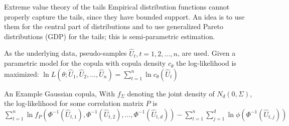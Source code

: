 Extreme value theory of the tails
Empirical distribution functions cannot properly capture the tails, since they have bounded support. An idea is to use them for the central part of distributions and to use generalized Pareto distributions (GDP) for the tails; this is semi-parametric estimation.

As the underlying data, pseudo-samples \(\hat{U}_t, t = 1, 2, ..., n\), are used.
Given a parametric model for the copula with copula density \(c_\theta\) the log-likelihood is maximized:
\(\ln L(\theta; \hat{U}_1, \hat{U}_2, ..., \hat{U}_n) = \sum_{t = 1}^n \ln c_\theta(\hat{U}_t)\)

An Example Gaussian copula, 
With \(f_\Sigma\) denoting the joint density of \(N_d(0, \Sigma)\), the log-likelihood for some correlation matrix \(P\) is
\(\sum_{t = 1}^n \ln f_P(\Phi^{-1}(\hat{U}_{t, 1}), \Phi^{-1}(\hat{U}_{t, 2}), ..., \Phi^{-1}(\hat{U}_{t, d})) - \sum_{t = 1}^n \sum_{j = 1}^d \ln \phi(\Phi^{-1}(\hat{U}_{t, j}))\)
